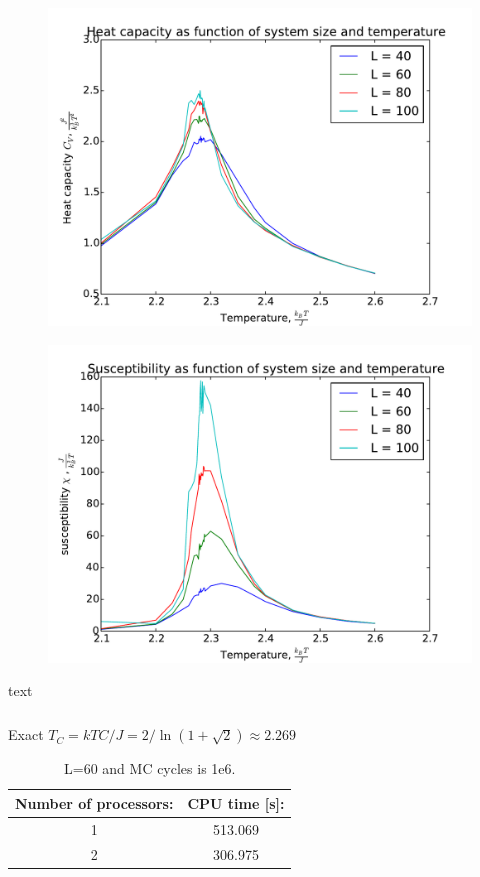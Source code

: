 \begin{figure}[H]
	\centering
	\includegraphics[width=0.7\linewidth]{../results/4e/4e_Cv}
	\caption{}
	\label{fig:4ecv}
\end{figure}

\begin{figure}[H]
	\centering
	\includegraphics[width=0.7\linewidth]{../results/4e/4e_x}
	\caption{}
	\label{fig:4ex}
\end{figure}


\begin{table}[H]
	\caption{text}
	\label{tab: T_C}
	\begin{tabular}{cccccc}
		
	\end{tabular}
\end{table}




Exact $T_C =  kTC/J = 2/ \ln(1+\sqrt{
	2}) \approx 2.269$ \cite{Onsager}

\begin{table}\caption{L=60 and MC cycles is 1e6.}
	\begin{tabular}{cc}
		Number of processors:& CPU time [s]: \\ \hline
		1 & 513.069\\
		2 & 306.975\\
	\end{tabular}
\end{table}
